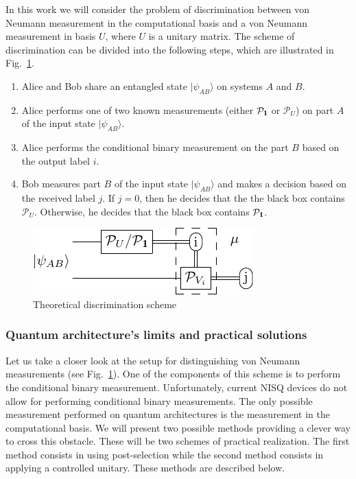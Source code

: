 \documentclass[preprint,12pt, a4paper]{elsarticle}
\newcommand{\ket}[1]{\ensuremath{|#1\rangle}}
\newcommand{\1}{{\rm 1\hspace{-0.9mm}l}}
\newcommand{\Id}{{\rm 1\hspace{-0.9mm}l}}
\newcommand{\PP}{\mathcal{P}}
\begin{document}
In this work we will consider the problem of discrimination between von Neumann 
measurement in the computational basis and a von Neumann measurement in basis 
$U$, where $U$ is a unitary matrix. 
The scheme of discrimination can be divided into the following steps, which are 
illustrated in Fig.~\ref{fig:theoretical_scheme}.




\begin{enumerate}
	\item Alice and Bob share an entangled state $\ket{\psi_{AB}}$ on systems 
	$A$ and $B$.
	\item Alice performs one of two known measurements (either $\PP_{\Id}$ or 
	$\PP_{U}$) on part $A$ of the input state  $\ket{\psi_{AB}}$.
	\item Alice performs the conditional binary measurement on the part 
	$B$ based on the output label $i$. 
	\item  Bob measures part $B$ of the input state  $\ket{\psi_{AB}}$ and 
	makes a decision based on the received label $j$. If $j=0$, then he decides 
	that the the black box contains $\PP_U$. Otherwise, he decides that the 
	black box contains $\PP_{\Id}$. 
\end{enumerate}  

\begin{figure}[h!]
	\centering
	\includegraphics[scale=1.7]{pics/theoretical_scheme}
	\caption{Theoretical discrimination scheme}
	\label{fig:theoretical_scheme}
\end{figure}

\subsubsection{Quantum architecture's limits and practical solutions}



Let us take a closer look at the setup for distinguishing von Neumann 
measurements (see Fig.~\ref{fig:theoretical_scheme}). One of the components of 
this scheme is to perform the conditional binary measurement. 
Unfortunately, current NISQ devices do not allow for performing conditional 
binary measurements.
The only possible measurement performed on quantum architectures is the 
measurement in the computational basis. 
We  will present two possible methods providing a clever way to cross this 
obstacle. These will be two schemes of practical realization. 
The first method consists in using post-selection while the second method 
consists in applying a controlled unitary. These methods are described below. 
\end{document}
